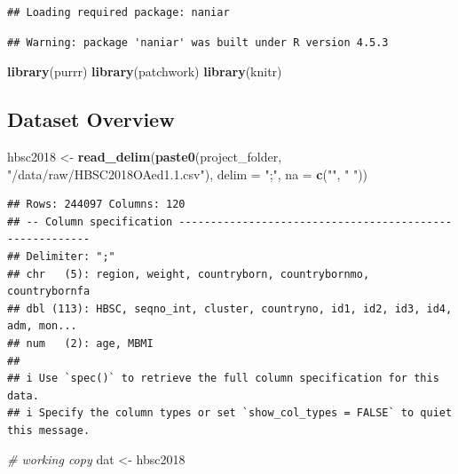\documentclass[
]{article}
\newenvironment{Shaded}{\begin{snugshade}}{\end{snugshade}}
\newcommand{\AttributeTok}[1]{\textcolor[rgb]{0.13,0.29,0.53}{#1}}
\newcommand{\CommentTok}[1]{\textcolor[rgb]{0.56,0.35,0.01}{\textit{#1}}}
\newcommand{\FunctionTok}[1]{\textcolor[rgb]{0.13,0.29,0.53}{\textbf{#1}}}
\newcommand{\NormalTok}[1]{#1}
\newcommand{\OtherTok}[1]{\textcolor[rgb]{0.56,0.35,0.01}{#1}}
\newcommand{\StringTok}[1]{\textcolor[rgb]{0.31,0.60,0.02}{#1}}
\begin{document}
\begin{verbatim}
## Loading required package: naniar
\end{verbatim}

\begin{verbatim}
## Warning: package 'naniar' was built under R version 4.5.3
\end{verbatim}

\begin{Shaded}
\begin{Highlighting}[]
\FunctionTok{library}\NormalTok{(purrr)}
\FunctionTok{library}\NormalTok{(patchwork)}
\FunctionTok{library}\NormalTok{(knitr)}
\end{Highlighting}
\end{Shaded}

\subsection{Dataset Overview}\label{dataset-overview}

\begin{Shaded}
\begin{Highlighting}[]
\NormalTok{hbsc2018 }\OtherTok{\textless{}{-}} \FunctionTok{read\_delim}\NormalTok{(}\FunctionTok{paste0}\NormalTok{(project\_folder,}
                                  \StringTok{"/data/raw/HBSC2018OAed1.1.csv"}\NormalTok{),}
                       \AttributeTok{delim =} \StringTok{";"}\NormalTok{,}
                       \AttributeTok{na =} \FunctionTok{c}\NormalTok{(}\StringTok{""}\NormalTok{, }\StringTok{" "}\NormalTok{))}
\end{Highlighting}
\end{Shaded}

\begin{verbatim}
## Rows: 244097 Columns: 120
## -- Column specification --------------------------------------------------------
## Delimiter: ";"
## chr   (5): region, weight, countryborn, countrybornmo, countrybornfa
## dbl (113): HBSC, seqno_int, cluster, countryno, id1, id2, id3, id4, adm, mon...
## num   (2): age, MBMI
## 
## i Use `spec()` to retrieve the full column specification for this data.
## i Specify the column types or set `show_col_types = FALSE` to quiet this message.
\end{verbatim}

\begin{Shaded}
\begin{Highlighting}[]
\CommentTok{\# working copy}
\NormalTok{dat }\OtherTok{\textless{}{-}}\NormalTok{ hbsc2018}
\end{Highlighting}
\end{Shaded}
\end{document}
